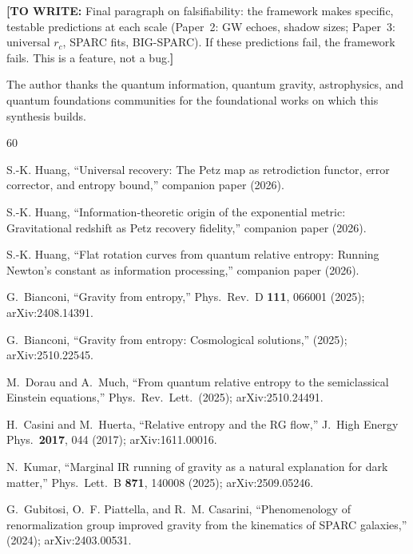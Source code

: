 \documentclass[prl,twocolumn,superscriptaddress,longbibliography,floatfix]{revtex4-2}
\newcommand{\towrite}[1]{{\color{blue}\textbf{[TO WRITE:} #1\textbf{]}}}
\begin{document}
\towrite{Final paragraph on falsifiability: the framework makes
specific, testable predictions at each scale (Paper~2: GW echoes,
shadow sizes; Paper~3: universal $r_c$, SPARC fits, BIG-SPARC).
If these predictions fail, the framework fails. This is a
feature, not a bug.}

\begin{acknowledgments}
The author thanks the quantum information, quantum gravity,
astrophysics, and quantum foundations communities for the
foundational works on which this synthesis builds.
\end{acknowledgments}


\begin{thebibliography}{60}

S.-K. Huang,
``Universal recovery: The Petz map as retrodiction functor,
error corrector, and entropy bound,''
companion paper (2026).

S.-K. Huang,
``Information-theoretic origin of the exponential metric:
Gravitational redshift as Petz recovery fidelity,''
companion paper (2026).

S.-K. Huang,
``Flat rotation curves from quantum relative entropy:
Running Newton's constant as information processing,''
companion paper (2026).

G.~Bianconi,
``Gravity from entropy,''
Phys.\ Rev.\ D \textbf{111}, 066001 (2025);
arXiv:2408.14391.

G.~Bianconi,
``Gravity from entropy: Cosmological solutions,''
(2025); arXiv:2510.22545.

M.~Dorau and A.~Much,
``From quantum relative entropy to the semiclassical Einstein
equations,''
Phys.\ Rev.\ Lett.\ (2025); arXiv:2510.24491.

H.~Casini and M.~Huerta,
``Relative entropy and the RG flow,''
J.\ High Energy Phys.\ \textbf{2017}, 044 (2017);
arXiv:1611.00016.

N.~Kumar,
``Marginal IR running of gravity as a natural explanation for
dark matter,''
Phys.\ Lett.\ B \textbf{871}, 140008 (2025);
arXiv:2509.05246.

G.~Gubitosi, O.~F. Piattella, and R.~M. Casarini,
``Phenomenology of renormalization group improved gravity from
the kinematics of SPARC galaxies,''
(2024); arXiv:2403.00531.


\end{thebibliography}
\end{document}
